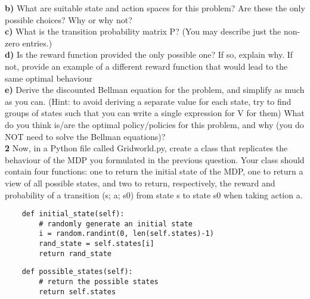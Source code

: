 \documentclass[11pt]{article}
\begin{document}
\noindent
\textbf{b)}
\noindent
What are suitable state and action spaces for this problem? Are
these the only possible choices? Why or why not?\\

\noindent
\textbf{c)}
\noindent
What is the transition probability matrix P? (You may describe just
the non-zero entries.)\\

\noindent
\textbf{d)}
\noindent
Is the reward function provided the only possible one? If so, explain
why. If not, provide an example of a different reward function that would lead
to the same optimal behaviour\\

\noindent
\textbf{e)}
\noindent
Derive the discounted Bellman equation for the problem, and simplify
as much as you can. (Hint: to avoid deriving a separate value for each state,
try to find groups of states such that you can write a single expression for V for
them) What do you think is/are the optimal policy/policies for this problem,
and why (you do NOT need to solve the Bellman equations)?\\

\noindent
\textbf{2}
\noindent
Now, in a Python file called Gridworld.py, create a class that replicates
the behaviour of the MDP you formulated in the previous question. Your class
should contain four functions: one to return the initial state of the MDP, one to
return a view of all possible states, and two to return, respectively, the reward and
probability of a transition (s; a; s0) from state s to state s0 when taking action a.\\

\lstset{language=Python}
\lstset{frame=lines}
\lstset{basicstyle=\footnotesize}
\begin{lstlisting}
    def initial_state(self):
        # randomly generate an initial state
        i = random.randint(0, len(self.states)-1)
        rand_state = self.states[i]
        return rand_state
\end{lstlisting}

\lstset{basicstyle=\footnotesize}
\begin{lstlisting}
    def possible_states(self):
        # return the possible states
        return self.states
\end{lstlisting}
\end{document}
